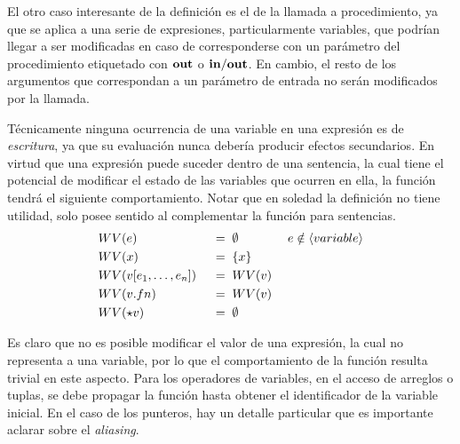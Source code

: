 
El otro caso interesante de la definición es el de la llamada a procedimiento, ya que se aplica a una serie de expresiones, particularmente variables, que podrían llegar a ser modificadas en caso de corresponderse con un parámetro del procedimiento etiquetado con $\mathbf{out}$ o $\mathbf{in/out}$.
En cambio, el resto de los argumentos que correspondan a un parámetro de entrada no serán modificados por la llamada.

Técnicamente ninguna ocurrencia de una variable en una expresión es de \textit{escritura}, ya que su evaluación nunca debería producir efectos secundarios.
En virtud que una expresión puede suceder dentro de una sentencia, la cual tiene el potencial de modificar el estado de las variables que ocurren en ella, la función tendrá el siguiente comportamiento.
Notar que en soledad la definición no tiene utilidad, solo posee sentido al complementar la función para sentencias.
\begin{alignat*}{3}
&WV(e)
&&\;=\;
\emptyset
&&\;e \notin \langle variable \rangle
\\
&WV(x)
&&\;=\;
\{ x \}
\\
&WV(v [e_1, \ldots, e_n])
&&\;=\;
WV(v)
\\
&WV(v.fn)
&&\;=\;
WV(v)
\\
&WV(\star v)
&&\;=\;
\emptyset
\end{alignat*}

Es claro que no es posible modificar el valor de una expresión, la cual no representa a una variable, por lo que el comportamiento de la función resulta trivial en este aspecto.
Para los operadores de variables, en el acceso de arreglos o tuplas, se debe propagar la función hasta obtener el identificador de la variable inicial.
En el caso de los punteros, hay un detalle particular que es importante aclarar sobre el \textit{aliasing}.

